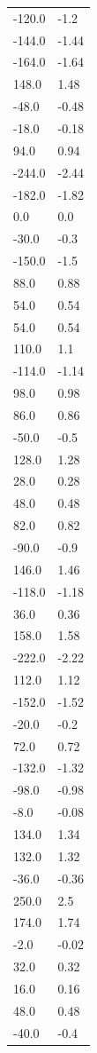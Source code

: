 \begin{longtable}{ll}
-120.0 & -1.2 \\
-144.0 & -1.44 \\
-164.0 & -1.64 \\
148.0 & 1.48 \\
-48.0 & -0.48 \\
-18.0 & -0.18 \\
94.0 & 0.94 \\
-244.0 & -2.44 \\
-182.0 & -1.82 \\
0.0 & 0.0 \\
-30.0 & -0.3 \\
-150.0 & -1.5 \\
88.0 & 0.88 \\
54.0 & 0.54 \\
54.0 & 0.54 \\
110.0 & 1.1 \\
-114.0 & -1.14 \\
98.0 & 0.98 \\
86.0 & 0.86 \\
-50.0 & -0.5 \\
128.0 & 1.28 \\
28.0 & 0.28 \\
48.0 & 0.48 \\
82.0 & 0.82 \\
-90.0 & -0.9 \\
146.0 & 1.46 \\
-118.0 & -1.18 \\
36.0 & 0.36 \\
158.0 & 1.58 \\
-222.0 & -2.22 \\
112.0 & 1.12 \\
-152.0 & -1.52 \\
-20.0 & -0.2 \\
72.0 & 0.72 \\
-132.0 & -1.32 \\
-98.0 & -0.98 \\
-8.0 & -0.08 \\
134.0 & 1.34 \\
132.0 & 1.32 \\
-36.0 & -0.36 \\
250.0 & 2.5 \\
174.0 & 1.74 \\
-2.0 & -0.02 \\
32.0 & 0.32 \\
16.0 & 0.16 \\
48.0 & 0.48 \\
-40.0 & -0.4 \\

\end{longtable}
